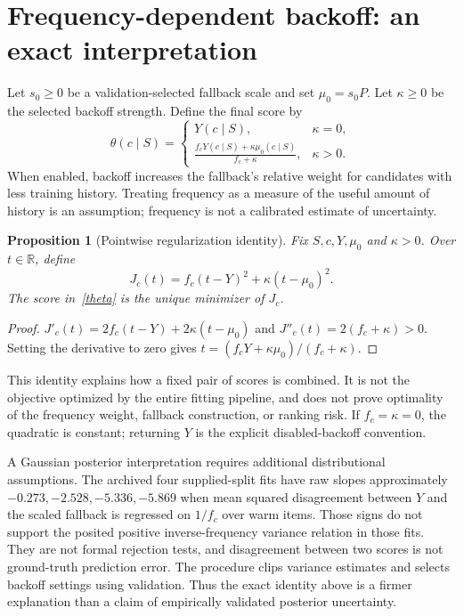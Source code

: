 \documentclass[11pt,a4paper]{article}
\newtheorem{proposition}{Proposition}
\begin{document}
\section{Frequency-dependent backoff: an exact interpretation}
Let $s_0\geq0$ be a validation-selected fallback scale and set $\mu_0=s_0P$.
Let $\kappa\geq0$ be the selected backoff strength. Define the final score by
\begin{equation}\label{theta}
 \theta(c\mid S)=\begin{cases}
 Y(c\mid S),&\kappa=0,\\[2pt]
 \displaystyle\frac{f_cY(c\mid S)+\kappa\mu_0(c\mid S)}{f_c+\kappa},&\kappa>0.
 \end{cases}
\end{equation}
When enabled, backoff increases the fallback's relative weight for candidates with
less training history. Treating frequency as a measure of the useful amount of
history is an assumption; frequency is not a calibrated estimate of uncertainty.

\begin{proposition}[Pointwise regularization identity]
Fix $S,c,Y,\mu_0$ and $\kappa>0$. Over $t\in\mathbb R$, define
\[
 J_c(t)=f_c(t-Y)^2+\kappa(t-\mu_0)^2.
\]
The score in~\eqref{theta} is the unique minimizer of $J_c$.
\end{proposition}
\begin{proof}
$J'_c(t)=2f_c(t-Y)+2\kappa(t-\mu_0)$ and
$J''_c(t)=2(f_c+\kappa)>0$. Setting the derivative to zero gives
$t=(f_cY+\kappa\mu_0)/(f_c+\kappa)$.
\end{proof}
This identity explains how a fixed pair of scores is combined. It is not the
objective optimized by the entire fitting pipeline, and does not prove optimality
of the frequency weight, fallback construction, or ranking risk. If $f_c=\kappa=0$,
the quadratic is constant; returning $Y$ is the explicit disabled-backoff convention.

A Gaussian posterior interpretation requires additional distributional assumptions.
The archived four supplied-split fits have raw slopes approximately
$-0.273,-2.528,-5.336,-5.869$ when mean squared disagreement between $Y$ and the scaled
fallback is regressed on $1/f_c$ over warm items. Those signs do not support the
posited positive inverse-frequency variance relation in those fits. They are not
formal rejection tests, and disagreement between two scores is not ground-truth
prediction error. The procedure clips variance estimates and selects backoff settings
using validation. Thus the exact identity above is a firmer explanation than a claim
of empirically validated posterior uncertainty.
\end{document}

